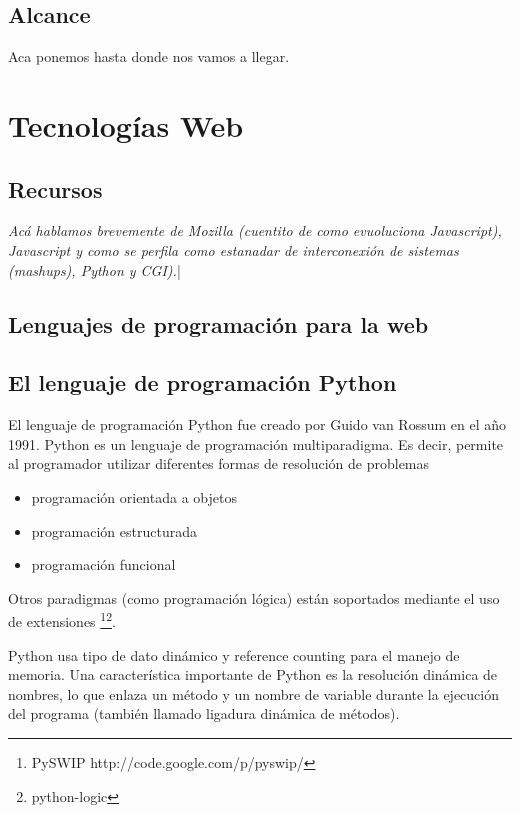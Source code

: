 \documentclass[a4paper]{report}
\begin{document}
\section{Alcance}

Aca ponemos hasta donde nos vamos a llegar.

\chapter{}

\chapter{Tecnologías Web}

\section{Recursos}
\emph{Acá hablamos brevemente de Mozilla (cuentito de como evuoluciona Javascript), Javascript y como se 
perfila como estanadar de interconexión de sistemas (mashups), Python y CGI).}|
 
\section{Lenguajes de programación para la web}
\section{El lenguaje de programación Python}
\label{lang:python}
El lenguaje de programación Python fue creado por Guido van Rossum en el año 1991.
Python es un lenguaje de programación multiparadigma. Es decir, permite al 
programador utilizar diferentes formas de resolución de problemas
\begin{itemize}
 \item {programación orientada a objetos}
 \item {programación estructurada}
 \item {programación funcional}
\end{itemize}
Otros paradigmas (como programación lógica) están soportados mediante el uso de extensiones
\footnote{PySWIP http://code.google.com/p/pyswip/}\footnote{python-logic}.

Python usa tipo de dato dinámico y reference counting para el manejo de memoria. 
Una característica importante de Python es la resolución dinámica de nombres, 
lo que enlaza un método y un nombre de variable durante la ejecución del programa 
(también llamado ligadura dinámica de métodos).
\end{document}
